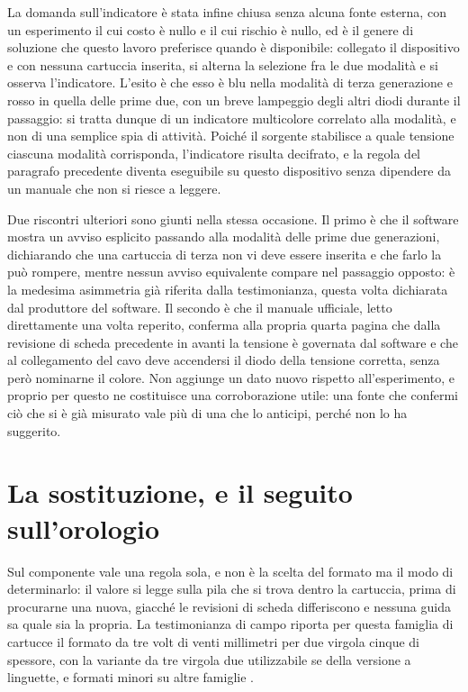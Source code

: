 La domanda sull'indicatore è stata infine chiusa senza alcuna fonte esterna, con un esperimento il cui costo è nullo e il cui rischio è nullo, ed è il genere di soluzione che questo lavoro preferisce quando è disponibile: collegato il dispositivo e con nessuna cartuccia inserita, si alterna la selezione fra le due modalità e si osserva l'indicatore. L'esito è che esso è blu nella modalità di terza generazione e rosso in quella delle prime due, con un breve lampeggio degli altri diodi durante il passaggio: si tratta dunque di un indicatore multicolore correlato alla modalità, e non di una semplice spia di attività. Poiché il sorgente stabilisce a quale tensione ciascuna modalità corrisponda, l'indicatore risulta decifrato, e la regola del paragrafo precedente diventa eseguibile su questo dispositivo senza dipendere da un manuale che non si riesce a leggere.

Due riscontri ulteriori sono giunti nella stessa occasione. Il primo è che il software mostra un avviso esplicito passando alla modalità delle prime due generazioni, dichiarando che una cartuccia di terza non vi deve essere inserita e che farlo la può rompere, mentre nessun avviso equivalente compare nel passaggio opposto: è la medesima asimmetria già riferita dalla testimonianza, questa volta dichiarata dal produttore del software. Il secondo è che il manuale ufficiale, letto direttamente una volta reperito, conferma alla propria quarta pagina che dalla revisione di scheda precedente in avanti la tensione è governata dal software e che al collegamento del cavo deve accendersi il diodo della tensione corretta, senza però nominarne il colore. Non aggiunge un dato nuovo rispetto all'esperimento, e proprio per questo ne costituisce una corroborazione utile: una fonte che confermi ciò che si è già misurato vale più di una che lo anticipi, perché non lo ha suggerito.

\section{La sostituzione, e il seguito sull'orologio}

Sul componente vale una regola sola, e non è la scelta del formato ma il modo di determinarlo: il valore si legge sulla pila che si trova dentro la cartuccia, prima di procurarne una nuova, giacché le revisioni di scheda differiscono e nessuna guida sa quale sia la propria. La testimonianza di campo riporta per questa famiglia di cartucce il formato da tre volt di venti millimetri per due virgola cinque di spessore, con la variante da tre virgola due utilizzabile se della versione a linguette, e formati minori su altre famiglie \cite{insidegadgets-canale}.

